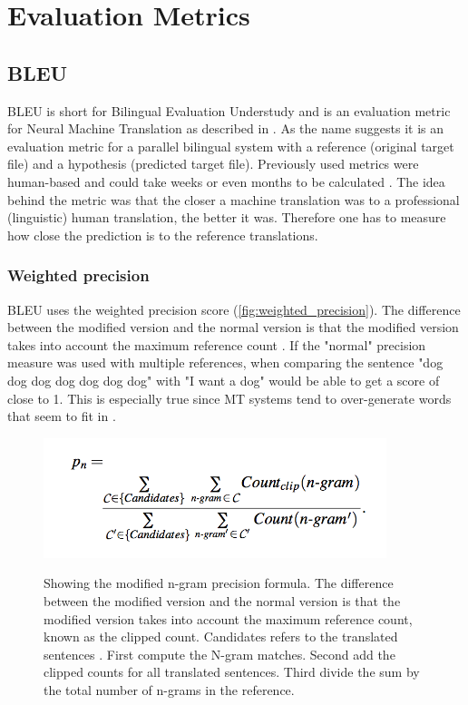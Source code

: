 \section {Evaluation Metrics}
\subsection{BLEU}

BLEU is short for Bilingual Evaluation Understudy and is an evaluation metric for Neural Machine Translation as described in \cite{papineni2002bleu}. As the name suggests it is an evaluation metric for a parallel bilingual system with a reference (original target file) and a hypothesis (predicted target file). Previously used metrics were human-based and could take weeks or even months to be calculated \cite{papineni2002bleu}. The idea behind the metric was that the closer a machine translation was to a professional (linguistic) human translation, the better it was. Therefore one has to measure how close the prediction is to the reference translations.

\subsubsection{Weighted precision}
BLEU uses the weighted precision score (\autoref{fig:weighted_precision}). The difference between the modified version and the normal version is that the modified version takes into account the maximum reference count \cite{chan}. If the "normal" precision measure was used with multiple references, when comparing the sentence "dog dog dog dog dog dog dog" with "I want a dog" would be able to get a score of close to 1. This is especially true since MT systems tend to over-generate words that seem to fit in \cite{papineni2002bleu}.


\begin{figure}[h]
\caption{Showing the modified n-gram precision formula. The difference between the modified version and the normal version is that the modified version takes into account the maximum reference count, known as the clipped count. Candidates refers to the translated sentences \cite{chan} \cite{papineni2002bleu}. First compute the N-gram matches. Second add the clipped counts for all translated sentences. Third divide the sum by the total number of n-grams in the reference. \cite{chan}}
 \centering 
 \includegraphics[width=10cm]{Bachelor CSAI thesis template/images/weighted_precision.png}
 \label{fig:weighted_precision}
\end{figure}

